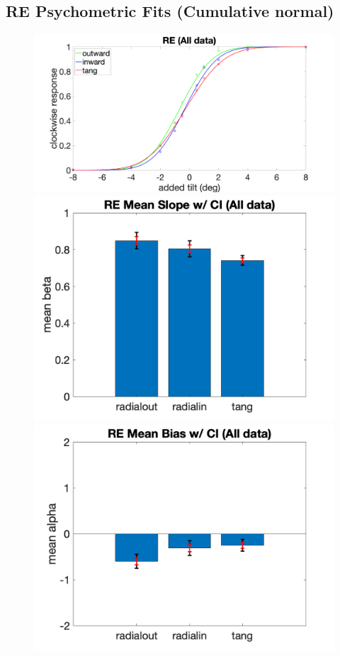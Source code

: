 \documentclass[11pt]{article} %
\begin{document}
\subsection{RE Psychometric Fits (Cumulative normal)}
\begin{figure}[H]
\centering %
\includegraphics[scale=.06]{Images/PF_RE_allcond.png}
\includegraphics[scale=.11]{Images/MeanSlopeError_ci_RE_allcond.png}
\includegraphics[scale=.11]{Images/MeanBiasError_ci_RE_allcond.png}

\end{figure}
\end{document}
